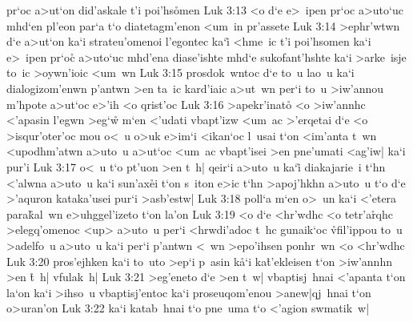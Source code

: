 pr`oc
a>ut`on
did'askale
t'i
poi'hs\r{o}men\bibvsend
{}
\vs Luk 3:13
<o
d`e
e>~ipen
pr`oc
a>uto`uc
mhd`en
pl'eon
par`a
t`o
diatetagm'enon
<um~in
pr'assete\bibvsend
\vs Luk 3:14
>ephr'wtwn
d`e
a>ut`on
ka`i
strateu'omenoi
l'egontec
ka`i\r{}
<hme~ic
t'i
poi'hsomen
ka`i
e>~ipen
pr`oc\r{}
a>uto`uc
mhd'ena
diase'ishte
mhd`e
sukofant'hshte
ka`i
>arke~isje
to~ic
>oywn'ioic
<um~wn\bibvsend
\vs Luk 3:15
prosdok~wntoc
d`e
to~u
lao~u
ka`i
dialogizom'enwn
p'antwn
>en
ta~ic
kard'iaic
a>ut~wn
per`i
to~u
>iw'annou
m'hpote
a>ut`oc
e>'ih
<o
qrist'oc\bibvsend
\vs Luk 3:16
>apekr'inato\r{}
<o
>iw'annhc
<'apasin
l'egwn
>eg`w\r{}
m`en
<'udati
vbapt'izw
<um~ac
>'erqetai
d`e
<o
>isqur'oter'oc
mou
o<~u
o>uk
e>im`i
<ikan`oc
l~usai
t`on
<im'anta
t~wn
<upodhm'atwn
a>uto~u
a>ut`oc
<um~ac
vbapt'isei
>en
pne'umati
<ag'iw|
ka`i
pur'i\bibvsend
\vs Luk 3:17
o<~u
t`o
pt'uon
>en
t~h|
qeir`i
a>uto~u
ka`i\r{}
diakajarie~i
t`hn
<'alwna
a>uto~u
ka`i
sun'ax\r{e}i
t`on
s~iton
e>ic
t`hn
>apoj'hkhn
a>uto~u
t`o
d`e
>'aquron
kataka'usei
pur`i
>asb'estw|\bibvsend
\vs Luk 3:18
poll`a
m`en
o>~un
ka`i
<'etera
para\r{k}al~wn
e>uhggel'izeto
t`on
la'on\bibvsend
\vs Luk 3:19
<o
d`e
<hr'wdhc
<o
tetr'a\r{r}qhc
>elegq'omenoc
<up>
a>uto~u
per`i
<hrwdi'adoc
t~hc
gunaik`oc
\r{vf}il'ippou
to~u
>adelfo~u
a>uto~u
ka`i
per`i
p'antwn
<~wn
>epo'ihsen
ponhr~wn
<o
<hr'wdhc\bibvsend
\vs Luk 3:20
pros'ejhken
ka`i
to~uto
>ep`i
p~asin
k\r{a}`i
ka\r{t}'ekleisen
t`on
>iw'annhn
>en
\r{t}~h|
vfulak~h|\bibvsend
\vs Luk 3:21
>eg'eneto
d`e
>en
t~w|
vbaptisj~hnai
<'apanta
t`on
la`on
ka`i
>ihso~u
vbaptisj'entoc
ka`i
proseuqom'enou
>anew|qj~hnai
t`on
o>uran'on\bibvsend
\vs Luk 3:22
ka`i
katab~hnai
t`o
pne~uma
t`o
<'agion
swmatik~w|
